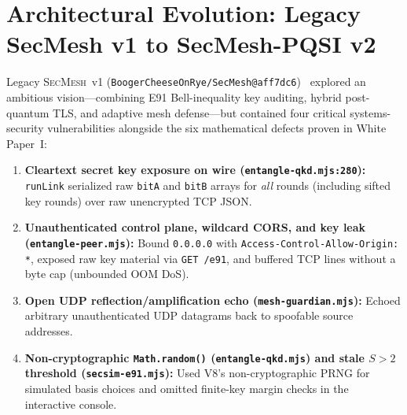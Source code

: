 \documentclass[11pt,reqno]{amsart}
\newcommand{\code}[1]{\texttt{\small #1}}
\begin{document}
\section{Architectural Evolution: Legacy SecMesh v1 to SecMesh-PQSI v2}
\label{sec:arch}

Legacy \textsc{SecMesh}~v1 (\code{BoogerCheeseOnRye/SecMesh@aff7dc6})~\cite{secmesh_upstream} explored an ambitious vision---combining E91 Bell-inequality key auditing, hybrid post-quantum TLS, and adaptive mesh defense---but contained four critical systems-security vulnerabilities alongside the six mathematical defects proven in White Paper~I:
\begin{enumerate}[leftmargin=1.8em]
  \item \textbf{Cleartext secret key exposure on wire (\code{entangle-qkd.mjs:280}):} \code{runLink} serialized raw \code{bitA} and \code{bitB} arrays for \emph{all} rounds (including sifted key rounds) over raw unencrypted TCP JSON.
  \item \textbf{Unauthenticated control plane, wildcard CORS, and key leak (\code{entangle-peer.mjs}):} Bound \code{0.0.0.0} with \code{Access-Control-Allow-Origin: *}, exposed raw key material via \code{GET /e91}, and buffered TCP lines without a byte cap (unbounded OOM DoS).
  \item \textbf{Open UDP reflection/amplification echo (\code{mesh-guardian.mjs}):} Echoed arbitrary unauthenticated UDP datagrams back to spoofable source addresses.
  \item \textbf{Non-cryptographic \code{Math.random()} (\code{entangle-qkd.mjs}) and stale $S > 2$ threshold (\code{secsim-e91.mjs}):} Used V8's non-cryptographic PRNG for simulated basis choices and omitted finite-key margin checks in the interactive console.
\end{enumerate}
\end{document}
